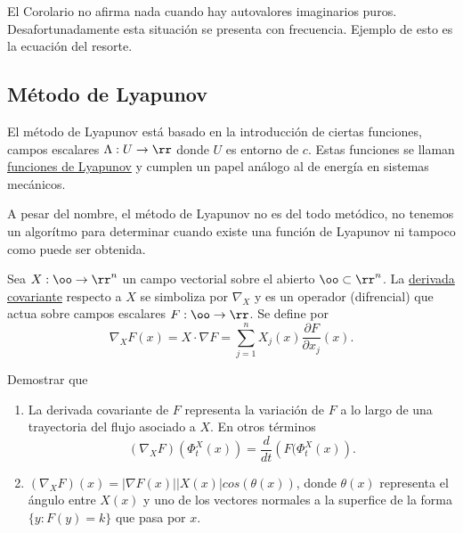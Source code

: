 El Corolario no afirma nada cuando hay autovalores imaginarios puros. Desafortunadamente esta situación se presenta con frecuencia.
Ejemplo de esto es la ecuación del resorte.
 


\subsection{Método de Lyapunov}

El método de Lyapunov está basado en la introducción de ciertas funciones, campos escalares 
 $\Lambda:U\to \rr$ donde $U$ es entorno de $c$. Estas funciones se llaman \href{http://es.wikipedia.org/wiki/Función_de_Lyapunov}{funciones de Lyapunov} y
 cumplen un papel análogo al de energía en sistemas mecánicos.
 
 A pesar del nombre, el método de Lyapunov no es del todo metódico, no tenemos un algorítmo para determinar 
 cuando existe una función de Lyapunov ni tampoco como puede ser obtenida.


\begin{definicion}
               Sea $X:\oo\to\rr^n$ un campo vectorial sobre el abierto $\oo\subset\rr^n$. La 
               \href{http://es.wikipedia.org/wiki/Derivada_covariante}{derivada covariante} respecto a $X$
               se simboliza por $\nabla_X$ y es un operador (difrencial) que actua sobre campos escalares 
               $F:\oo\to\rr$. Se define por
               \[
               \nabla_XF(x)=X\cdot\nabla F=\sum_{j=1}^nX_j(x) \frac{\partial F}{\partial x_j}(x).
                \]

\end{definicion}




\begin{ejercicio} Demostrar que
  \begin{enumerate}
    \item La derivada covariante de $F$ representa la variación de $F$ a lo largo de una 
   trayectoria del flujo asociado a $X$. En otros términos
   \[(\nabla_XF)(\Phi_t^X(x))=\frac{d}{dt}\left(F(\Phi_t^X(x)\right).\]
    \item $(\nabla_XF)(x)=|\nabla F(x)||X(x)|cos(\theta(x))$, donde $\theta(x)$ representa el ángulo entre $X(x)$ 
   y uno de los vectores normales a la superfice de la forma $\{y:F(y)=k\}$ que pasa por $x$.
  \end{enumerate}
\end{ejercicio}


